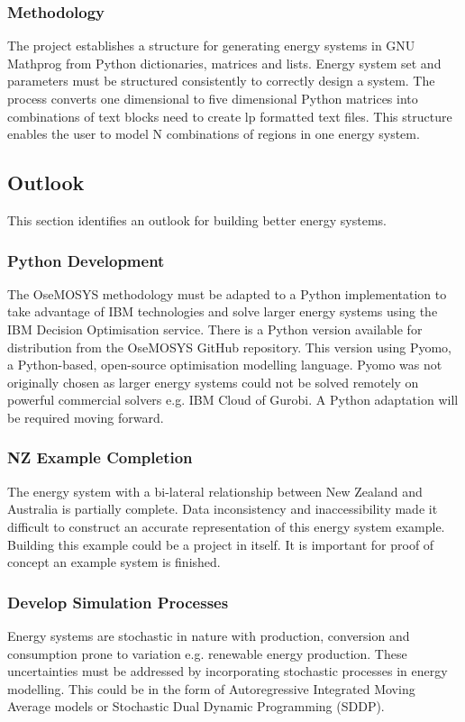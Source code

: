 \documentclass[12pt]{article}
\begin{document}
\subsubsection{Methodology}\label{KFM}
The project establishes a structure for generating energy systems in GNU Mathprog from Python dictionaries, matrices and lists.
Energy system set and parameters must be structured consistently to correctly design a system.
The process converts one dimensional to five dimensional Python matrices into combinations of text blocks need to create lp formatted text files.
This structure enables the user to model N combinations of regions in one energy system.
\subsection{Outlook}\label{FW}
This section identifies an outlook for building better energy systems.
\subsubsection{Python Development}
The OseMOSYS methodology must be adapted to a Python implementation to take advantage of IBM technologies and solve larger energy systems using the IBM Decision Optimisation service.
There is a Python version available for distribution from the OseMOSYS GitHub repository.
This version using Pyomo, a Python-based, open-source optimisation modelling language.
Pyomo was not originally chosen as larger energy systems could not be solved remotely on powerful commercial solvers e.g. IBM Cloud of Gurobi.
A Python adaptation will be required moving forward.
\subsubsection{NZ Example Completion} \label{FutureWork}
The energy system with a bi-lateral relationship between New Zealand and Australia is partially complete.
Data inconsistency and inaccessibility made it difficult to construct an accurate representation of this energy system example.
Building this example could be a project in itself.
It is important for proof of concept an example system is finished.
\subsubsection{Develop Simulation Processes}
Energy systems are stochastic in nature with production, conversion and consumption prone to variation e.g. renewable energy production.
These uncertainties must be addressed by incorporating stochastic processes in energy modelling.
This could be in the form of Autoregressive Integrated Moving Average models or Stochastic Dual Dynamic Programming (SDDP).
\end{document}
